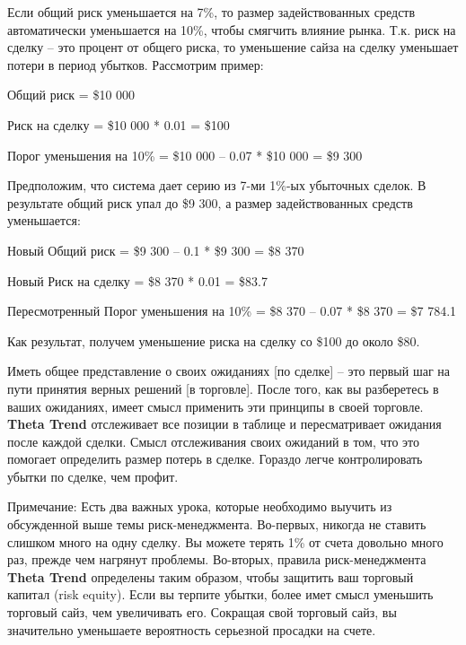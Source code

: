 \documentclass[12pt,DIV=18]{scrartcl}
\begin{document}
Если общий риск уменьшается на 7\%, то размер задействованных средств автоматически уменьшается на 10\%, чтобы смягчить влияние рынка. Т.к. риск на сделку -- это процент от общего риска, то уменьшение сайза на сделку уменьшает потери в период убытков. Рассмотрим пример:

\bigskip

\setlength{\parindent}{0.5cm}
Общий риск = \$10 000\par
Риск на сделку = \$10 000 * 0.01 = \$100\par
Порог уменьшения на 10\% = \$10 000 -- 0.07 * \$10 000 = \$9 300\par

\bigskip
\setlength{\parindent}{0cm}
Предположим, что система дает серию из 7-ми 1\%-ых убыточных сделок. В результате общий риск упал до \$9 300, а размер задействованных средств уменьшается:

\bigskip

\setlength{\parindent}{0.5cm}
Новый Общий риск = \$9 300 -- 0.1 * \$9 300 = \$8 370\par
Новый Риск на сделку = \$8 370 * 0.01 = \$83.7\par
Пересмотренный Порог уменьшения на 10\% = \$8 370 -- 0.07 * \$8 370 = \$7 784.1\par

\bigskip

Как результат, получем уменьшение риска на сделку со \$100 до около \$80.

\bigskip

Иметь общее представление о своих ожиданиях [по сделке] -- это первый шаг на пути принятия верных решений [в торговле]. После того, как вы разберетесь в ваших ожиданиях, имеет смысл применить эти принципы в своей торговле. \textbf{Theta Trend} отслеживает все позиции в таблице и пересматривает ожидания после каждой сделки. Смысл отслеживания своих ожиданий в том, что это помогает определить размер потерь в сделке. Гораздо легче контролировать убытки по сделке, чем профит.

\bigskip

Примечание: Есть два важных урока, которые необходимо выучить из обсужденной выше темы риск-менеджмента. Во-первых, никогда не ставить слишком много на одну сделку. Вы можете терять 1\% от счета довольно много раз, прежде чем нагрянут проблемы. Во-вторых, правила риск-менеджмента \textbf{Theta Trend} определены таким образом, чтобы защитить ваш торговый капитал (risk equity). Если вы терпите убытки, более имет смысл уменьшить торговый сайз, чем увеличивать его. Сокращая свой торговый сайз, вы значительно уменьшаете вероятность серьезной просадки на счете.
\end{document}
